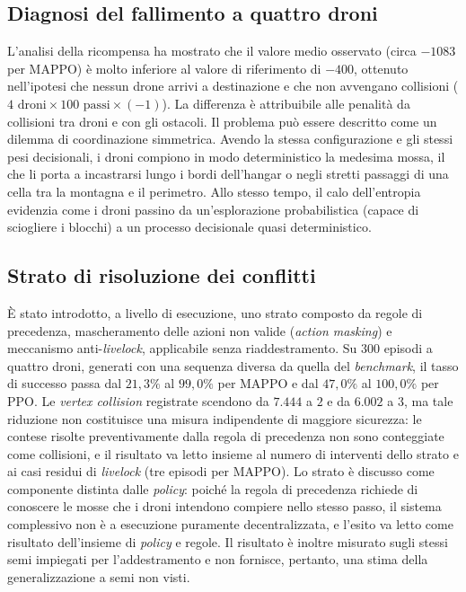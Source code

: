 \documentclass[12pt,a4paper,twoside]{report}
\begin{document}
\subsection{Diagnosi del fallimento a quattro droni}
L'analisi della ricompensa ha mostrato che il valore medio osservato (circa $-1083$ per MAPPO) è molto inferiore al valore di riferimento di $-400$, ottenuto nell'ipotesi che nessun drone arrivi a destinazione e che non avvengano collisioni ($4\text{ droni} \times 100\text{ passi} \times (-1)$). La differenza è attribuibile alle penalità da collisioni tra droni e con gli ostacoli. Il problema può essere descritto come un dilemma di coordinazione simmetrica. Avendo la stessa configurazione e gli stessi pesi decisionali, i droni compiono in modo deterministico la medesima mossa, il che li porta a incastrarsi lungo i bordi dell'hangar o negli stretti passaggi di una cella tra la montagna e il perimetro. Allo stesso tempo, il calo dell'entropia evidenzia come i droni passino da un'esplorazione probabilistica (capace di sciogliere i blocchi) a un processo decisionale quasi deterministico.
\subsection{Strato di risoluzione dei conflitti}
È stato introdotto, a livello di esecuzione, uno strato composto da regole di precedenza, mascheramento delle azioni non valide (\emph{action masking}) e meccanismo anti-\emph{livelock}, applicabile senza riaddestramento. Su $300$ episodi a quattro droni, generati con una sequenza diversa da quella del \emph{benchmark}, il tasso di successo passa dal $21,3\%$ al $99,0\%$ per MAPPO e dal $47,0\%$ al $100,0\%$ per PPO. Le \emph{vertex collision} registrate scendono da $7.444$ a $2$ e da $6.002$ a $3$, ma tale riduzione non costituisce una misura indipendente di maggiore sicurezza: le contese risolte preventivamente dalla regola di precedenza non sono conteggiate come collisioni, e il risultato va letto insieme al numero di interventi dello strato e ai casi residui di \emph{livelock} (tre episodi per MAPPO). Lo strato è discusso come componente distinta dalle \emph{policy}: poiché la regola di precedenza richiede di conoscere le mosse che i droni intendono compiere nello stesso passo, il sistema complessivo non è a esecuzione puramente decentralizzata, e l'esito va letto come risultato dell'insieme di \emph{policy} e regole. Il risultato è inoltre misurato sugli stessi semi impiegati per l'addestramento e non fornisce, pertanto, una stima della generalizzazione a semi non visti.
\end{document}

